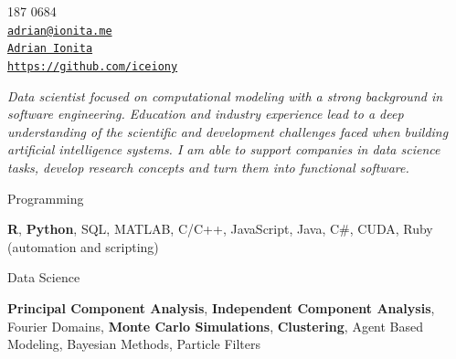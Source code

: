 \documentclass[11pt,article,oneside]{memoir}
\makeatletter
\def\myauthor{Adrian Ionita}
\def\myemail{adrian@ionita.me}
\def\myweb{https://github.com/iceiony}
\def\myphone{0797 187 0684}
\def\mytwitter{@iceiony}
\def\mylinkedin{https://uk.linkedin.com/in/adrian-ionita-6a923129}
\makeatother
\begin{document}
%
\hfill
\begin{minipage}[t]{1.3in}
  \flushright \footnotesize  \contactblock \myphone \, \faPhone \\ 
  {\scriptsize  \texttt{\href{mailto:\myemail}{\myemail}} \, \faEnvelope} \\
  {\scriptsize  \texttt{\href{\mylinkedin}{\myauthor}} \, \faLinkedinSquare }  \\ 
  {\scriptsize  \texttt{\href{\myweb}{\myweb}} \, \faGithub}
\end{minipage}

{\vskip -0.8cm}
\reversemarginpar

\bigskip      
\medskip

\noindent\emph{Data scientist focused on computational modeling with a strong background in software engineering.
Education and industry experience lead to a deep understanding of the scientific and development challenges faced when building artificial intelligence systems.
I am able to support companies in data science tasks, develop research concepts and turn them into functional software.
}
\bigskip


\ind Programming

\ind \hspace{0.354in} \footnotesize \textbf{R}, \textbf{Python}, SQL, MATLAB, C/C++, JavaScript, Java, C\#, CUDA, Ruby (automation and scripting) \normalsize 

\ind Data Science

\ind \hspace{0.354in} \footnotesize \textbf{Principal Component Analysis}, \textbf{Independent Component Analysis}, Fourier Domains,
\textbf{Monte Carlo Simulations}, \textbf{Clustering}, Agent Based Modeling, Bayesian Methods, Particle Filters \normalsize
\end{document}
